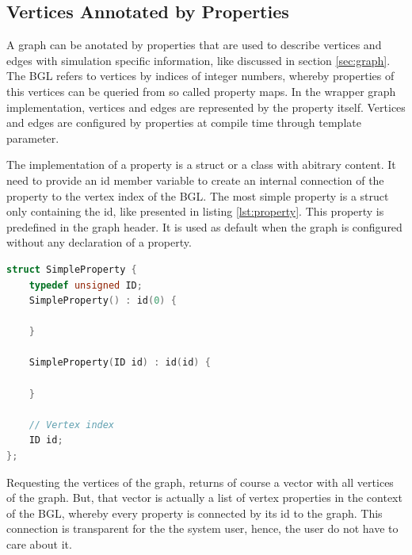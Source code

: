 \subsection{Vertices Annotated by Properties}

A graph can be anotated by properties that are used to describe
vertices and edges with simulation specific information, like
discussed in section \ref{sec:graph}. The BGL refers to vertices by
indices of integer numbers, whereby properties of this vertices can be
queried from so called property maps. In the wrapper graph implementation,
vertices and edges are represented by the property itself. Vertices
and edges are configured by properties at compile time through
template parameter.

The implementation of a property is a struct or a class with abitrary content. It need
to provide an id member variable to create an internal connection of
the property to the vertex index of the BGL.  The most simple property
is a struct only containing the id, like presented in listing
\ref{lst:property}. This property is predefined in the graph
header. It is used as default when the graph is configured without any
declaration of a property.

\begin{lstlisting}[language=C++, label=lst:property]
struct SimpleProperty {
    typedef unsigned ID;
    SimpleProperty() : id(0) {

    }
    
    SimpleProperty(ID id) : id(id) {

    }

    // Vertex index
    ID id;
};
\end{lstlisting}

Requesting the vertices of the graph, returns of course a vector with
all vertices of the graph. But, that vector is actually a list of vertex
properties in the context of the BGL, whereby every property is
connected by its id to the graph. This connection is transparent for
the the system user, hence, the user do not have to care about it.



